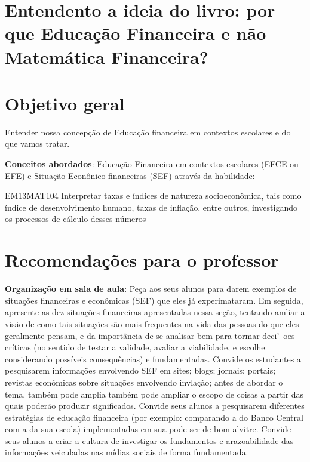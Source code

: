 \mainmatter


\begin{paginatexto}
\section*{Entendento a ideia do livro: por que Educação Financeira e não Matemática Financeira?}

\section*{Objetivo geral}

Entender nossa concepção de Educação financeira em contextos escolares e do que vamos tratar.

\textbf{Conceitos abordados}: Educação Financeira em contextos escolares (EFCE ou EFE) e Situação Econônico-financeiras (SEF) através da habilidade:

\begin{objetivos}{EM13MAT104}
Interpretar taxas e índices de natureza socioeconômica, tais como índice de desenvolvimento humano, taxas de inflação, entre outros, investigando os processos de cálculo desses números
\end{objetivos}

\section{Recomendações para o professor}

\textbf{Organização em sala de aula}: Peça aos seus alunos para darem exemplos de situações financeiras e econômicas (SEF) que eles já experimataram. Em seguida, apresente as dez situações financeiras apresentadas nessa seção, tentando amliar a visão de como tais situações são mais frequentes na vida das pessoas do que eles geralmente pensam, e da importância de se analisar bem para tormar deci'~oes críticas (no sentido de testar a validade, avaliar a viabilidade, e escolhe considerando possíveis consequências) e fundamentadas. Convide os estudantes a pesquisarem informações envolvendo SEF em sites; blogs; jornais; portais; revistas econômicas sobre situações envolvendo invlação; antes de abordar o tema, também pode amplia também pode ampliar o escopo de coisas a partir das quais poderão produzir significados. Convide seus alunos a pesquisarem diferentes estratégias de educação financeira (por exemplo: comparando a do Banco Central com a da sua escola) implementadas em sua pode ser de bom alvitre. Convide seus alunos a criar a cultura de investigar os fundamentos e arazoabilidade das informações veiculadas nas mídias sociais de forma fundamentada.


\end{paginatexto}
